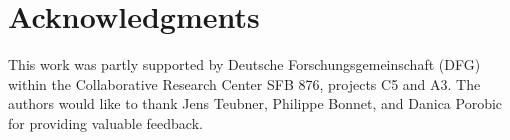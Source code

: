 \documentclass[11pt]{article}
\begin{document}

\section*{Acknowledgments}
This work was partly supported by Deutsche Forschungsgemeinschaft (DFG) 
within the Collaborative Research Center SFB 876, projects C5 and A3.
The authors would like to thank Jens Teubner, Philippe Bonnet, and Danica Porobic for providing valuable feedback.
\end{document}
